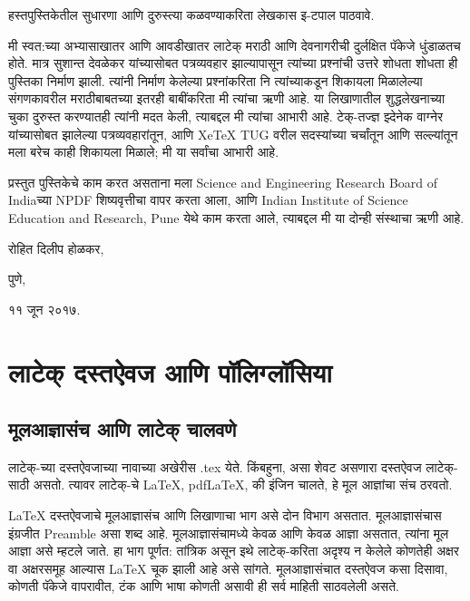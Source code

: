 \documentclass[11pt]{article}
\newcommand{\7}{\textbackslash}
\newcommand{\Syn}{\textenglish}
\begin{document}
हस्तपुस्तिकेतील सुधारणा आणि दुरुस्त्या कळवण्याकरिता लेखकास इ-टपाल पाठवावे. 
\medskip

मी स्वत:च्या अभ्यासाखातर आणि आवडीखातर लाटेक् मराठी आणि देवनागरीची दुर्लक्षित पॅकेजे धुंडाळतच होते. मात्र सुशान्त देवळेकर यांच्यासोबत पत्रव्यवहार झाल्यापासून त्यांच्या प्रश्नांची उत्तरे शोधता शोधता ही पुस्तिका निर्माण झाली. त्यांनी निर्माण केलेल्या प्रश्नांकरिता नि त्यांच्याकडून शिकायला मिळालेल्या संगणकावरील मराठीबाबतच्या इतरही बाबींकरिता मी त्यांचा ऋणी आहे. या लिखाणातील शुद्धलेखनाच्या चुका दुरुस्त करण्यातही त्यांनी मदत केली, त्याबद्दल मी त्यांचा आभारी आहे.
टेक्-तज्ज्ञ झ्देनेक वाग्नेर यांच्यासोबत झालेल्या पत्रव्यवहारांतून, आणि \Syn{XeTeX TUG} वरील सदस्यांच्या चर्चांतून आणि सल्ल्यांतून मला बरेच काही शिकायला मिळाले; मी या सर्वांचा आभारी आहे. 
\medskip

प्रस्तुत पुस्तिकेचे काम करत असताना मला {\Bask Science and Engineering Research Board of India}च्या {\Bask NPDF} शिष्यवृत्तीचा वापर करता आला, आणि {\Bask Indian Institute of Science Education and Research, Pune} येथे काम करता आले, त्याबद्दल मी या दोन्ही संस्थाचा ऋणी आहे.

\begin{flushright}
 रोहित दिलीप होळकर,

पुणे,

११ जून २०१७.
\end{flushright}

\newpage

\section{लाटेक् दस्तऐवज आणि पॉलिग्लॉसिया}

\subsection{मूलआज्ञासंच आणि लाटेक् चालवणे}
\label{sec:preamble-proc}

लाटेक्-च्या दस्तऐवजाच्या नावाच्या अखेरीस \Syn{.tex} येते. किंबहुना, असा शेवट असणारा दस्तऐवज
लाटेक्-साठी असतो. त्यावर लाटेक्-चे \Syn{\Bask \LaTeX, pdf\LaTeX, \XeLaTeX} की
\Syn{\Bask {\LuaTeX}} इंजिन चालते, हे मूल आज्ञांचा संच ठरवतो.
\medskip

{\Bask \LaTeX} दस्तऐवजाचे मूलआज्ञासंच आणि लिखाणाचा भाग असे दोन विभाग असतात. मूलआज्ञासंचास
इंग्रजीत {\Bask Preamble} असा शब्द आहे. मूलआज्ञासंचामध्ये केवळ आणि केवळ आज्ञा असतात,
त्यांना मूल आज्ञा असे म्हटले जाते. हा भाग पूर्णत: तांत्रिक असून इथे लाटेक्-करिता अदृश्य न केलेले
कोणतेही अक्षर वा अक्षरसमूह आल्यास {\Bask \LaTeX} चूक झाली आहे असे सांगते. मूलआज्ञासंचात दस्तऐवज कसा
दिसावा, कोणती पॅकेजे वापरावीत, टंक आणि भाषा कोणती असावी ही सर्व
माहिती साठवलेली असते.
\end{document}
